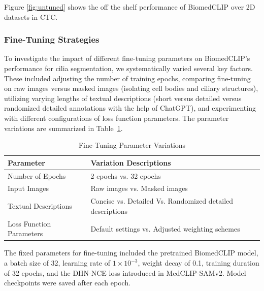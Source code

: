 \documentclass[./dissertation.tex]{subfiles}
\begin{document}
Figure \ref{fig:untuned} shows the off the shelf performance of BiomedCLIP over 2D datasets in CTC.
\subsubsection{Fine-Tuning Strategies}



To investigate the impact of different fine-tuning parameters on BiomedCLIP's performance for cilia segmentation, we systematically varied several key factors. These included adjusting the number of training epochs, comparing fine-tuning on raw images versus masked images (isolating cell bodies and ciliary structures), utilizing varying lengths of textual descriptions (short versus detailed versus randomized detailed annotations with the help of ChatGPT), and experimenting with different configurations of loss function parameters. The parameter variations are summarized in Table~\ref{tab:fine-tune-params}.

\begin{table}[htbp]
    \centering
    \caption{Fine-Tuning Parameter Variations}
    \label{tab:fine-tune-params}
    \begin{tabular}{ll}
        \toprule
        \textbf{Parameter}       & \textbf{Variation Descriptions}                           \\ \midrule
        Number of Epochs         & 2 epochs vs. 32 epochs                                    \\
        Input Images             & Raw images vs. Masked images                              \\
        Textual Descriptions     & Concise vs. Detailed Vs. Randomized detailed descriptions \\
        Loss Function Parameters & Default settings vs. Adjusted weighting schemes           \\
        \bottomrule
    \end{tabular}
\end{table}
The fixed parameters for fine-tuning included the pretrained BiomedCLIP model, a batch size of 32, learning rate of \(1\times10^{-3}\), weight decay of 0.1, training duration of 32 epochs, and the DHN-NCE loss introduced in MedCLIP-SAMv2. Model checkpoints were saved after each epoch.
\end{document}
